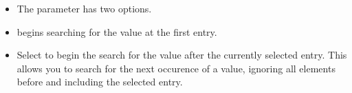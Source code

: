 \begin{itemize}
\item The  parameter has two options. 
\item  {} begins searching for the value at the first entry.
\item Select  to begin the search for the value after the currently selected entry. This allows you to search for the next occurence of a value, ignoring all elements before and including the selected entry. 
\end{itemize}
